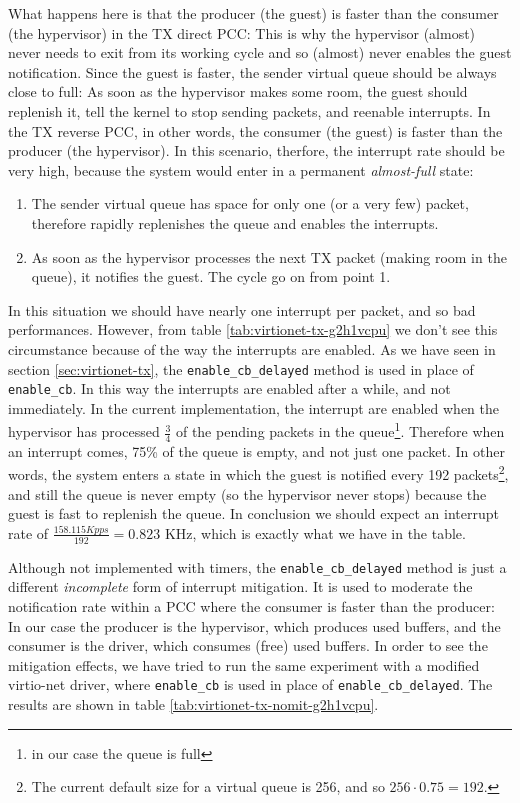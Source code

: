What happens here is that the producer (the guest) is faster than the consumer (the hypervisor) in the TX direct PCC: This is why the 
hypervisor (almost) never needs to exit from its working cycle and so (almost) never enables the guest notification. 
Since the guest is faster, the sender virtual queue 
should be always close to full: As soon as the hypervisor makes some room, the guest should replenish it, tell the kernel to stop 
sending packets, and reenable interrupts. In the TX reverse PCC, in other words, the consumer (the guest) is faster than the producer 
(the hypervisor).
In this scenario, therfore, the interrupt rate should be very high, because the system would
enter in a permanent \emph{almost-full} state:
\begin{enumerate}
  \item The sender virtual queue has space for only one (or a very few) packet, therefore rapidly replenishes the queue and enables the
	interrupts.
  \item As soon as the hypervisor processes the next TX packet (making room in the queue), it notifies the guest. The cycle go on from
	point 1.
\end{enumerate}
In this situation we should have nearly one interrupt per packet, and so bad performances. However, from table 
\ref{tab:virtionet-tx-g2h1vcpu} we don't see this circumstance because of the way the interrupts are enabled. As we have seen in 
section \ref{sec:virtionet-tx}, the \texttt{enable\_cb\_delayed} method is used in place of \texttt{enable\_cb}. In this way the interrupts
are enabled after a while, and not immediately. In the current implementation, the interrupt are enabled when the hypervisor has processed
$\frac{3}{4}$ of the pending packets in the queue\footnote{in our case the queue is full}. Therefore when an interrupt comes, 75\% of the
queue is empty, and not just one packet. In other words, the system enters a state in which the guest is notified every 192
packets\footnote{The current default size for a virtual queue is 256, and so $256 \cdot 0.75 = 192$.}, and still the queue is never
empty (so the hypervisor never stops) because the guest is fast to replenish the queue. In conclusion we should expect an interrupt rate of
$\frac{158.115 Kpps}{192} = 0.823$ KHz, which is exactly what we have in the table.

\vspace{0.5cm}

Although not implemented with timers, the \texttt{enable\_cb\_delayed} method is just a different \emph{incomplete} form of interrupt 
mitigation.
It is used to moderate the notification rate within a PCC where the consumer is faster than the producer: In our case
the producer is the hypervisor, which produces used buffers, and the consumer is the driver, which consumes (free) used buffers.
In order to see the mitigation effects, we have tried to run the same experiment with a modified virtio-net driver, where \texttt{enable\_cb}
is used in place of \texttt{enable\_cb\_delayed}. The results are shown in table \ref{tab:virtionet-tx-nomit-g2h1vcpu}.


